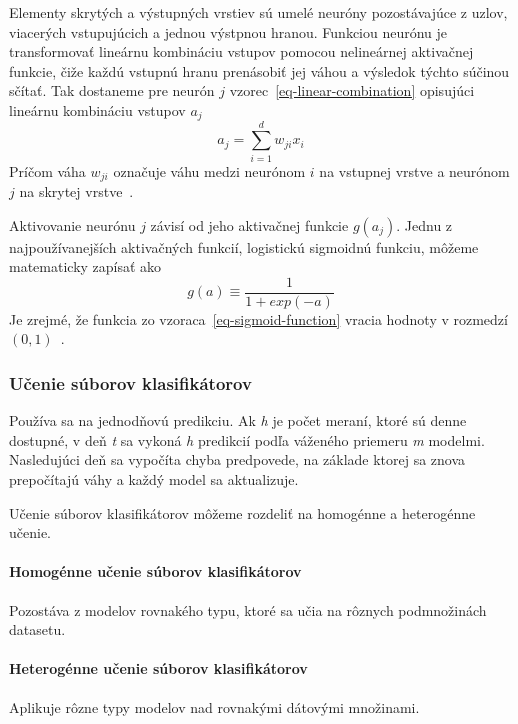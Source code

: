 \documentclass[a4paper,slovak,12pt,appendix]{article}
\begin{document}
Elementy skrytých a výstupných vrstiev sú umelé neuróny pozostávajúce z uzlov,
viacerých vstupujúcich a jednou výstpnou hranou. Funkciou neurónu je
transformovať lineárnu kombináciu vstupov pomocou nelineárnej aktivačnej
funkcie, čiže každú vstupnú hranu prenásobiť jej váhou a výsledok týchto súčinou
sčítať. Tak dostaneme pre neurón $j$ vzorec~\ref{eq-linear-combination}
opisujúci lineárnu kombináciu vstupov $a_j$
\begin{equation}
  a_j = \sum_{i=1}^{d} w_{ji} x_i
  \label{eq-linear-combination}
\end{equation}
Príčom váha $w_{ji}$ označuje váhu medzi neurónom $i$ na vstupnej vrstve
a neurónom $j$ na skrytej vrstve~\cite{Merz1998}.

Aktivovanie neurónu $j$ závisí od jeho aktivačnej funkcie $g(a_j)$. Jednu
z najpoužívanejších aktivačných funkcií, logistickú sigmoidnú funkciu, môžeme
matematicky zapísať ako
\begin{equation}
  g(a) \equiv \frac{1}{1 + exp(-a)}
  \label{eq-sigmoid-function}
\end{equation}
Je zrejmé, že funkcia zo vzoraca~\ref{eq-sigmoid-function} vracia hodnoty
v rozmedzí $(0,1)$~\cite{Merz1998}.


\subsubsection{Učenie súborov klasifikátorov}
Používa sa na jednodňovú predikciu. Ak \textit{h} je počet meraní, ktoré sú
denne dostupné, v deň \textit{t} sa vykoná \textit{h} predikcií podľa váženého
priemeru \textit{m} modelmi. Nasledujúci deň sa vypočíta chyba predpovede,
na základe ktorej sa znova prepočítajú váhy a každý model sa
aktualizuje\cite{Grmanova2016}.

Učenie súborov klasifikátorov môžeme rozdeliť na homogénne a heterogénne učenie.

\paragraph{Homogénne učenie súborov klasifikátorov}
Pozostáva z modelov rovnakého typu, ktoré sa učia na rôznych podmnožinách
datasetu.
\paragraph{Heterogénne učenie súborov klasifikátorov}
Aplikuje rôzne typy modelov nad rovnakými dátovými množinami\cite{Grmanova2016}.
\end{document}

